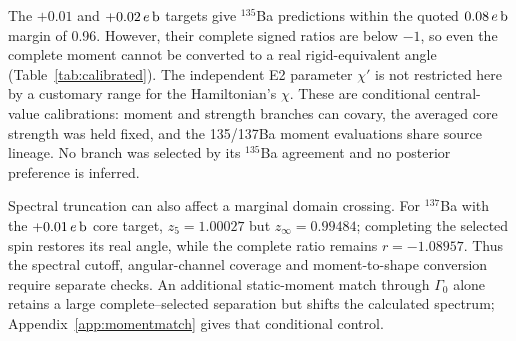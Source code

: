 The $+0.01$ and $+0.02\,e\,{\rm b}$ targets give $^{135}$Ba predictions
within the quoted $0.08\,e\,{\rm b}$ margin of 0.96.
However, their complete signed ratios are below $-1$, so even the complete
moment cannot be converted to a real rigid-equivalent angle
(Table~\ref{tab:calibrated}). The independent E2 parameter $\chi'$ is not
restricted here by a customary range for the Hamiltonian's $\chi$.
These are conditional central-value calibrations: moment and strength
branches can covary, the averaged core strength was held fixed, and the
135/137Ba moment evaluations share source lineage.
No branch was selected by its $^{135}$Ba agreement and no posterior
preference is inferred.

Spectral truncation can also affect a marginal domain crossing.
For $^{137}$Ba with the $+0.01\,e\,{\rm b}$ core target,
$z_5=1.00027$ but $z_\infty=0.99484$; completing the selected spin
restores its real angle, while the complete ratio remains
$r=-1.08957$. Thus the spectral cutoff, angular-channel coverage and
moment-to-shape conversion require separate checks.
An additional static-moment match through $\Gamma_0$ alone retains
a large complete--selected separation but shifts the calculated spectrum;
Appendix~\ref{app:momentmatch} gives that conditional control.
